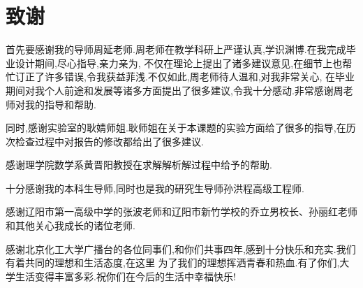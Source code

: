 \chapter*{致\qquad 谢}
首先要感谢我的导师周延老师.周老师在教学科研上严谨认真,学识渊博.在我完成毕业设计期间,尽心指导,亲力亲为,
不仅在理论上提出了诸多建议意见,在细节上也帮忙订正了许多错误,令我获益菲浅.不仅如此,周老师待人温和,对我非常关心,
在毕业期间对我个人前途和发展等诸多方面提出了很多建议,令我十分感动.非常感谢周老师对我的指导和帮助.\par
同时,感谢实验室的耿婧师姐.耿师姐在关于本课题的实验方面给了很多的指导,在历次检查过程中对报告的修改都给出了很多建议.\par
感谢理学院数学系黄晋阳教授在求解解析解过程中给予的帮助.\par
十分感谢我的本科生导师,同时也是我的研究生导师孙洪程高级工程师.\par
感谢辽阳市第一高级中学的张波老师和辽阳市新竹学校的乔立男校长、孙丽红老师和其他关心我成长的诸位老师.\par
感谢北京化工大学广播台的各位同事们,和你们共事四年,感到十分快乐和充实.我们有着共同的理想和生活态度,在这里
为了我们的理想挥洒青春和热血.有了你们,大学生活变得丰富多彩.祝你们在今后的生活中幸福快乐!\par
